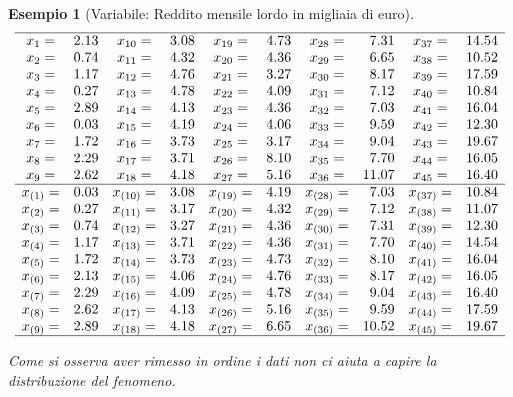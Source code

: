 \documentclass[
  11pt,
]{book}
\theoremstyle{mytheoremstyle}
\theoremstyle{mydefstyle}
\newtheorem{example}{{Esempio}}[section]
\begin{document}
\begin{example}[Variabile: Reddito mensile lordo in migliaia di euro]
\[\begin{array}{crcrcrcrcr}
\hline 
x_{1}= &  2.13 & x_{10}= &  3.08 & x_{19}= &  4.73 & x_{28}= &  7.31 & x_{37}= & 14.54 \\ 
x_{2}= &  0.74 & x_{11}= &  4.32 & x_{20}= &  4.36 & x_{29}= &  6.65 & x_{38}= & 10.52 \\ 
x_{3}= &  1.17 & x_{12}= &  4.76 & x_{21}= &  3.27 & x_{30}= &  8.17 & x_{39}= & 17.59 \\ 
x_{4}= &  0.27 & x_{13}= &  4.78 & x_{22}= &  4.09 & x_{31}= &  7.12 & x_{40}= & 10.84 \\ 
x_{5}= &  2.89 & x_{14}= &  4.13 & x_{23}= &  4.36 & x_{32}= &  7.03 & x_{41}= & 16.04 \\ 
x_{6}= &  0.03 & x_{15}= &  4.19 & x_{24}= &  4.06 & x_{33}= &  9.59 & x_{42}= & 12.30 \\ 
x_{7}= &  1.72 & x_{16}= &  3.73 & x_{25}= &  3.17 & x_{34}= &  9.04 & x_{43}= & 19.67 \\ 
x_{8}= &  2.29 & x_{17}= &  3.71 & x_{26}= &  8.10 & x_{35}= &  7.70 & x_{44}= & 16.05 \\ 
x_{9}= &  2.62 & x_{18}= &  4.18 & x_{27}= &  5.16 & x_{36}= & 11.07 & x_{45}= & 16.40 \\ 
\hline 
x_{(1)}= &  0.03 & x_{(10)}= &  3.08 & x_{(19)}= &  4.19 & x_{(28)}= &  7.03 & x_{(37)}= & 10.84 \\ 
x_{(2)}= &  0.27 & x_{(11)}= &  3.17 & x_{(20)}= &  4.32 & x_{(29)}= &  7.12 & x_{(38)}= & 11.07 \\ 
x_{(3)}= &  0.74 & x_{(12)}= &  3.27 & x_{(21)}= &  4.36 & x_{(30)}= &  7.31 & x_{(39)}= & 12.30 \\ 
x_{(4)}= &  1.17 & x_{(13)}= &  3.71 & x_{(22)}= &  4.36 & x_{(31)}= &  7.70 & x_{(40)}= & 14.54 \\ 
x_{(5)}= &  1.72 & x_{(14)}= &  3.73 & x_{(23)}= &  4.73 & x_{(32)}= &  8.10 & x_{(41)}= & 16.04 \\ 
x_{(6)}= &  2.13 & x_{(15)}= &  4.06 & x_{(24)}= &  4.76 & x_{(33)}= &  8.17 & x_{(42)}= & 16.05 \\ 
x_{(7)}= &  2.29 & x_{(16)}= &  4.09 & x_{(25)}= &  4.78 & x_{(34)}= &  9.04 & x_{(43)}= & 16.40 \\ 
x_{(8)}= &  2.62 & x_{(17)}= &  4.13 & x_{(26)}= &  5.16 & x_{(35)}= &  9.59 & x_{(44)}= & 17.59 \\ 
x_{(9)}= &  2.89 & x_{(18)}= &  4.18 & x_{(27)}= &  6.65 & x_{(36)}= & 10.52 & x_{(45)}= & 19.67 \\ 
\hline 
\end{array}\]

\normalsize

Come si osserva aver rimesso in ordine i dati non ci aiuta a capire la distribuzione del fenomeno.
\end{example}
\end{document}
